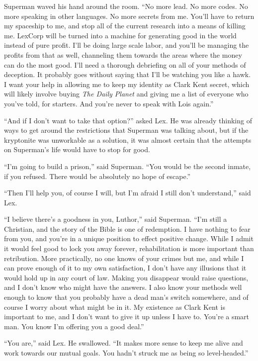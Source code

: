 \documentclass[ebook,12pt]{memoir}
\begin{document}
Superman waved his hand around the room. ``No more lead. No more codes.
No more speaking in other languages. No more secrets from me. You'll
have to return my spaceship to me, and stop all of the current research
into a means of killing me. LexCorp will be turned into a machine for
generating good in the world instead of pure profit. I'll be doing large
scale labor, and you'll be managing the profits from that as well,
channeling them towards the areas where the money can do the most good.
I'll need a thorough debriefing on all of your methods of deception. It
probably goes without saying that I'll be watching you like a hawk. I
want your help in allowing me to keep my identity as Clark Kent secret,
which will likely involve buying \emph{The Daily Planet} and giving me a
list of everyone who you've told, for starters. And you're never to
speak with Lois again.''

``And if I don't want to take that option?'' asked Lex. He was already
thinking of ways to get around the restrictions that Superman was
talking about, but if the kryptonite was unworkable as a solution, it
was almost certain that the attempts on Superman's life would have to
stop for good.

``I'm going to build a prison,'' said Superman. ``You would be the
second inmate, if you refused. There would be absolutely no hope of
escape.''

``Then I'll help you, of course I will, but I'm afraid I still don't
understand,'' said Lex.

``I believe there's a goodness in you, Luthor,'' said Superman. ``I'm
still a Christian, and the story of the Bible is one of redemption. I
have nothing to fear from you, and you're in a unique position to effect
positive change. While I admit it would feel good to lock you away
forever, rehabilitation is more important than retribution. More
practically, no one knows of your crimes but me, and while I can prove
enough of it to my own satisfaction, I don't have any illusions that it
would hold up in any court of law. Making you disappear would raise
questions, and I don't know who might have the answers. I also know your
methods well enough to know that you probably have a dead man's switch
somewhere, and of course I worry about what might be in it. My existence
as Clark Kent is important to me, and I don't want to give it up unless
I have to. You're a smart man. You know I'm offering you a good deal.''

``You are,'' said Lex. He swallowed. ``It makes more sense to keep me
alive and work towards our mutual goals. You hadn't struck me as being
so level‐headed.''
\end{document}
